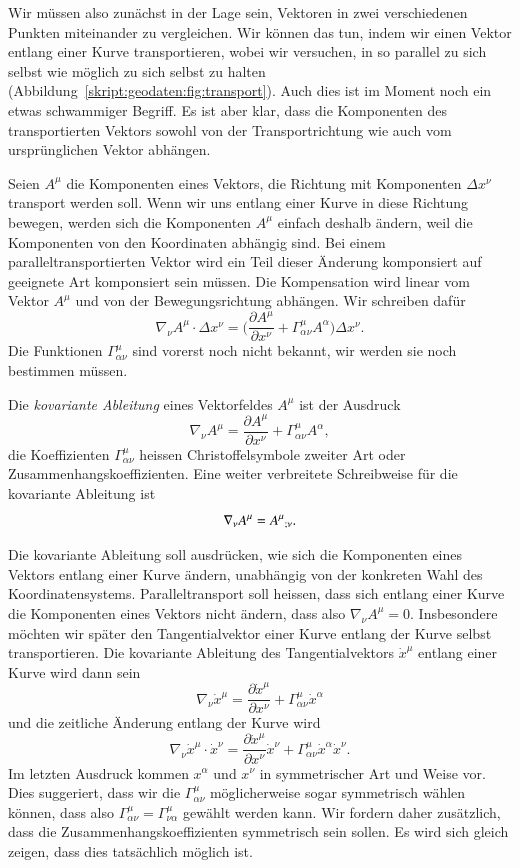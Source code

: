 Wir müssen also zunächst in der Lage sein, Vektoren in zwei verschiedenen
Punkten miteinander zu vergleichen.
Wir können das tun, indem wir einen Vektor entlang einer Kurve transportieren,
wobei wir versuchen, in so parallel zu sich selbst wie möglich zu sich
selbst zu halten (Abbildung~\ref{skript:geodaten:fig:transport}).
Auch dies ist im Moment noch ein etwas schwammiger Begriff. 
Es ist aber klar, dass die Komponenten des transportierten Vektors
sowohl von der Transportrichtung wie auch vom ursprünglichen Vektor
abhängen.

Seien $A^\mu$ die Komponenten eines Vektors, die Richtung mit Komponenten
$\Delta x^\nu$ transport werden soll.
Wenn wir uns entlang einer Kurve in diese Richtung bewegen, werden sich
die Komponenten $A^\mu$ einfach deshalb ändern, weil die Komponenten von
den Koordinaten abhängig sind.
Bei einem paralleltransportierten Vektor wird ein Teil dieser Änderung
komponsiert auf geeignete Art komponsiert sein müssen.
Die Kompensation wird linear vom Vektor $A^\mu$ und von der
Bewegungsrichtung abhängen.
Wir schreiben dafür
\[
\nabla_\nu A^\mu\cdot \Delta x^\nu
=
\biggl(\frac{\partial A^\mu}{\partial x^\nu}
+
\Gamma^\mu_{\alpha\nu}A^\alpha\biggr)\Delta x^\nu.
\]
Die Funktionen $\Gamma^\mu_{\alpha\nu}$ sind vorerst noch nicht bekannt,
wir werden sie noch bestimmen müssen.

\begin{definition}
Die {\em kovariante Ableitung} eines Vektorfeldes $A^\mu$ ist der 
Ausdruck
\begin{equation}
\nabla_\nu A^\mu
=
\frac{\partial A^\mu}{\partial x^\nu}
+
\Gamma^\mu_{\alpha\nu}A^\alpha,
\end{equation}
die Koeffizienten $\Gamma^\mu_{\alpha\nu}$ heissen Christoffelsymbole
zweiter Art oder Zusammenhangskoeffizienten.
Eine weiter verbreitete Schreibweise für die kovariante Ableitung
ist
\[
\nabla_\nu A^\mu
=
A^\mu\mathstrut_{;\nu}.
\]
\end{definition}

Die kovariante Ableitung soll ausdrücken, wie sich die Komponenten eines
Vektors entlang einer Kurve ändern, unabhängig von der konkreten Wahl
des Koordinatensystems.
Paralleltransport soll heissen, dass sich entlang einer Kurve die
Komponenten eines Vektors nicht ändern,
dass also $\nabla_\nu A^\mu=0$.
Insbesondere möchten wir später den Tangentialvektor einer Kurve entlang
der Kurve selbst transportieren.
Die kovariante Ableitung des Tangentialvektors $\dot x^\mu$ entlang
einer Kurve wird dann sein
\[
\nabla_\nu\dot x^\mu
=
\frac{\partial \dot x^\mu}{\partial x^\nu}
+
\Gamma^\mu_{\alpha\nu}\dot x^\alpha
\]
und die zeitliche Änderung entlang der Kurve wird
\[
\nabla_\nu\dot x^\mu\cdot \dot x^\nu
=
\frac{\partial \dot x^\mu}{\partial x^\nu}\dot x^\nu
+
\Gamma^\mu_{\alpha\nu}\dot x^\alpha \dot x^\nu.
\]
Im letzten Ausdruck kommen $x^\alpha$ und $x^\nu$ in symmetrischer
Art und Weise vor.
Dies suggeriert, dass wir die $\Gamma^\mu_{\alpha\nu}$ möglicherweise
sogar symmetrisch wählen können, dass also
$\Gamma^\mu_{\alpha\nu}=\Gamma^\mu_{\nu\alpha}$
gewählt werden kann.
Wir fordern daher zusätzlich, dass die Zusammenhangskoeffizienten
symmetrisch sein sollen.
Es wird sich gleich zeigen, dass dies tatsächlich möglich ist.

